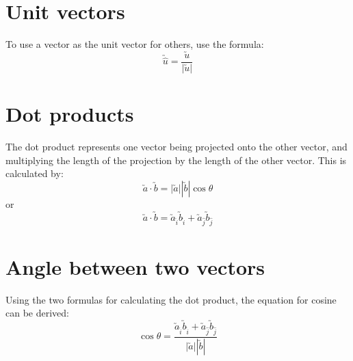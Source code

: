 \documentclass{book}
\begin{document}
\section{Unit vectors}
To use a vector as the unit vector for others, use the formula:
\[
	\utilde{\hat{u}} = \frac{\utilde{u}}{|\utilde{u}|}
\]

\section{Dot products}
The dot product represents one vector being projected onto the other vector, and multiplying the length of the projection by the length of the other vector.  This is calculated by:
\[\utilde{a} \cdot \utilde{b} = |\utilde{a}||\utilde{b}|\cos\theta\]
or
\[\utilde{a} \cdot \utilde{b} = \utilde{a}_{\hat{i}} \utilde{b}_{\hat{i}} + \utilde{a}_{\hat{j}} \utilde{b}_{\hat{j}}\]



\section{Angle between two vectors}
Using the two formulas for calculating the dot product, the equation for cosine can be derived:
\[
	\cos\theta = \frac{\utilde{a}_{\hat{i}} \utilde{b}_{\hat{i}} + \utilde{a}_{\hat{j}} \utilde{b}_{\hat{j}}}{|\utilde{a}||\utilde{b}|}
\]
\end{document}
